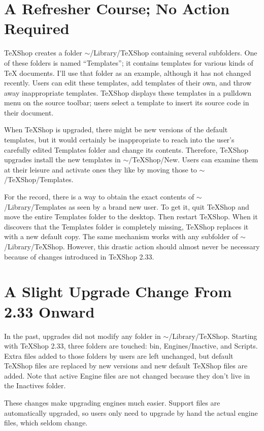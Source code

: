 \documentclass[11pt, oneside]{amsart}
\begin{document}
\section{A Refresher Course; No Action Required}

TeXShop creates a folder $\sim$/Library/TeXShop containing several subfolders. One of these folders is named ``Templates''; it  contains templates for various kinds of TeX documents. I'll use that folder as an example, although it has not changed recently. Users can edit these templates, add templates of their own, and throw away inappropriate templates. TeXShop displays these templates in a pulldown menu on the source toolbar; users select a template to insert its source code in their document.

When TeXShop is upgraded, there might be new versions of the default templates, but it would certainly be inappropriate to reach into the user's carefully edited Templates folder and change its contents. Therefore, TeXShop upgrades install the new templates in $\sim$/TeXShop/New.  Users can examine them at their leisure and activate ones they like by moving those to $\sim$/TeXShop/Templates.

For the record, there is a way to obtain the exact contents of $\sim$/Library/Templates as seen by a brand new user.  To get it, quit TeXShop and move the entire Templates folder to the desktop. Then restart TeXShop. When it discovers that the Templates folder is completely missing, TeXShop replaces it with a new default copy. The same mechanism works with any subfolder of $\sim$/Library/TeXShop. However, this drastic action should almost never be necessary because of changes introduced in TeXShop 2.33.

\section{A Slight Upgrade Change From 2.33 Onward}

In the past, upgrades did not modify any folder in $\sim$/Library/TeXShop. Starting with TeXShop 2.33, three folders are touched:  bin, Engines/Inactive, and Scripts. Extra files added to those folders by users are left unchanged, but default TeXShop files are replaced by new versions and new default TeXShop files are added. Note that active Engine files are not changed because they don't live in the Inactives folder.

These changes make upgrading engines much easier. Support files are automatically upgraded, so users only need to upgrade by hand  the actual engine files, which seldom change.
\end{document}
